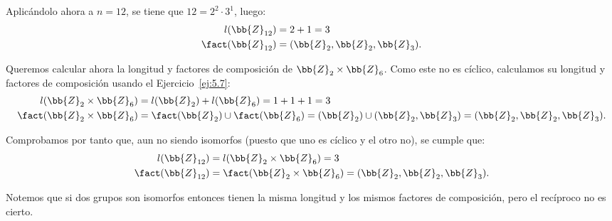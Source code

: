 \begin{ejercicio}
    Aplicándolo ahora a $n=12$, se tiene que $12=2^2\cdot 3^1$, luego:
    \begin{align*}
        l(\bb{Z}_{12}) &= 2+1 = 3 \\
        \fact(\bb{Z}_{12}) &= (\bb{Z}_2, \bb{Z}_2, \bb{Z}_3).
    \end{align*}

    Queremos calcular ahora la longitud y factores de composición de $\bb{Z}_2 \times \bb{Z}_6$. Como este no es cíclico, calculamos su longitud y factores de composición usando el Ejercicio~\ref{ej:5.7}:
    \begin{align*}
        l(\bb{Z}_2 \times \bb{Z}_6) &= l(\bb{Z}_2) + l(\bb{Z}_6) = 1 + 1+1 = 3 \\
        \fact(\bb{Z}_2 \times \bb{Z}_6) &= \fact(\bb{Z}_2)\cup\fact(\bb{Z}_6) = (\bb{Z}_2)\cup(\bb{Z}_2, \bb{Z}_3) = (\bb{Z}_2, \bb{Z}_2, \bb{Z}_3).
    \end{align*}

    Comprobamos por tanto que, aun no siendo isomorfos (puesto que uno es cíclico y el otro no), se cumple que:
    \begin{align*}
        l(\bb{Z}_{12}) &= l(\bb{Z}_2 \times \bb{Z}_6) = 3 \\
        \fact(\bb{Z}_{12}) &= \fact(\bb{Z}_2 \times \bb{Z}_6) = (\bb{Z}_2, \bb{Z}_2, \bb{Z}_3).
    \end{align*}

    Notemos que si dos grupos son isomorfos entonces tienen la misma longitud y los mismos factores de composición, pero el recíproco no es cierto.
\end{ejercicio}

